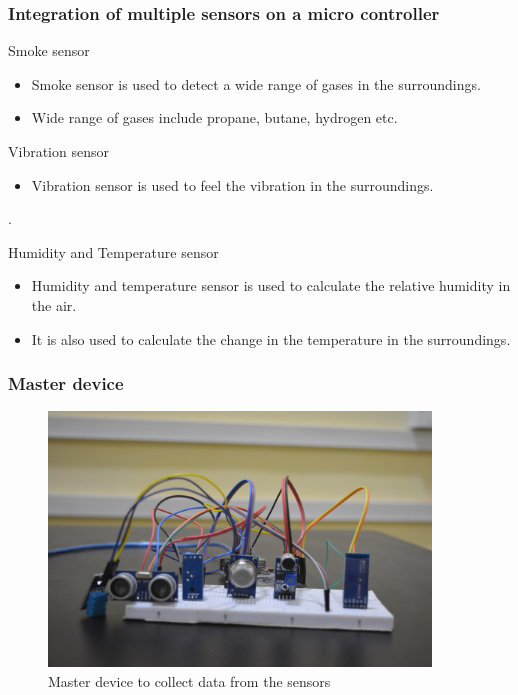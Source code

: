 \documentclass{beamer}
\begin{document}
  \begin{frame}\frametitle{Integration of multiple sensors on a micro controller}
 \item Smoke  sensor
\begin{itemize}
\item Smoke sensor is used to detect a wide range of gases in the surroundings.
\item Wide range of gases include propane, butane, hydrogen etc.
\end{itemize}
 \item Vibration sensor
\begin{itemize}
    \item Vibration sensor is used to feel the vibration in the surroundings. 
\end{itemize}
.

\end{frame}
 \begin{frame}
 \item Humidity and Temperature sensor
\begin{itemize}
\item Humidity and temperature sensor is used to calculate the relative humidity in the air.
\item It is also used to calculate the change in the temperature in the surroundings.
\end{itemize}
\end{frame}

\begin{frame}\frametitle{Master device}
\begin{itemize}
  \begin{figure}[H]
  \centerline{\includegraphics[width=4.0in]{master2.JPG}}
  \caption{ \textbf{}Master device to collect data from the sensors}
  \end{figure}
\end{itemize}
\end{frame}
\end{document}
